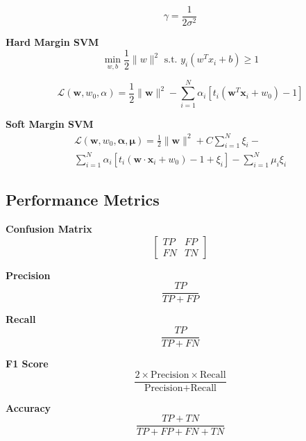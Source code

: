 \documentclass[8pt]{article}
\begin{document}
\begin{multicols}{2}
\begin{equation}
    \gamma = \frac{1}{2\sigma^2}
\end{equation}

\textbf{Hard Margin SVM}
\begin{equation}
    \min_{w, b} \frac{1}{2} \|w\|^2 \text{ s.t. } y_i(w^Tx_i + b) \geq 1
\end{equation}

\begin{equation}
    \mathcal{L}(\mathbf{w}, w_0, \alpha) = \frac{1}{2} \|\mathbf{w}\|^2 - \sum_{i=1}^{N} \alpha_i[t_i(\mathbf{w}^T\mathbf{x}_i + w_0) - 1]
\end{equation}

\textbf{Soft Margin SVM}
\begin{multline}
    \mathcal{L}(\mathbf{w}, w_0, \mathbf{\alpha}, \mathbf{\mu}) = \frac{1}{2} \|\mathbf{w}\|^2 + C \sum_{i=1}^{N} \xi_i - \\
    \sum_{i=1}^{N} \alpha_i[t_i(\mathbf{w} \cdot \mathbf{x}_i + w_0) - 1 + \xi_i] - \sum_{i=1}^{N} \mu_i \xi_i
\end{multline}

\subsection*{Performance Metrics}
\textbf{Confusion Matrix}
\begin{equation}
    \begin{bmatrix}
        TP & FP \\
        FN & TN
    \end{bmatrix}
\end{equation}

\textbf{Precision}
\begin{equation}
    \frac{TP}{TP + FP}
\end{equation}

\textbf{Recall}
\begin{equation}
    \frac{TP}{TP + FN}
\end{equation}

\textbf{F1 Score}
\begin{equation}
    \frac{2 \times \text{Precision} \times \text{Recall}}{\text{Precision} + \text{Recall}}
\end{equation}

\textbf{Accuracy}
\begin{equation}
    \frac{TP + TN}{TP + FP + FN + TN}
\end{equation}


\end{multicols}
\end{document}
